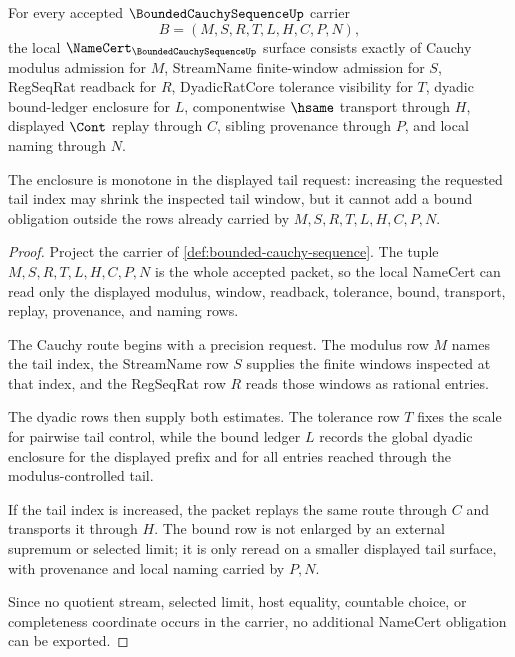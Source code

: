 \begin{theorem}
\label{thm:cauchy-tail-monotone-enclosure}
For every accepted $\BoundedCauchySequenceUp$ carrier
$$
B=(M,S,R,T,L,H,C,P,N),
$$
the local $\NameCert_{\BoundedCauchySequenceUp}$ surface consists exactly of Cauchy modulus admission for $M$, StreamName finite-window admission for $S$, RegSeqRat readback for $R$, DyadicRatCore tolerance visibility for $T$, dyadic bound-ledger enclosure for $L$, componentwise $\hsame$ transport through $H$, displayed $\Cont$ replay through $C$, sibling provenance through $P$, and local naming through $N$.

The enclosure is monotone in the displayed tail request: increasing the requested tail index may shrink the inspected tail window, but it cannot add a bound obligation outside the rows already carried by $M,S,R,T,L,H,C,P,N$.
\end{theorem}
\begin{proof}
Project the carrier of \autoref{def:bounded-cauchy-sequence}. The tuple $M,S,R,T,L,H,C,P,N$ is the whole accepted packet, so the local NameCert can read only the displayed modulus, window, readback, tolerance, bound, transport, replay, provenance, and naming rows.

The Cauchy route begins with a precision request. The modulus row $M$ names the tail index, the StreamName row $S$ supplies the finite windows inspected at that index, and the RegSeqRat row $R$ reads those windows as rational entries.

The dyadic rows then supply both estimates. The tolerance row $T$ fixes the scale for pairwise tail control, while the bound ledger $L$ records the global dyadic enclosure for the displayed prefix and for all entries reached through the modulus-controlled tail.

If the tail index is increased, the packet replays the same route through $C$ and transports it through $H$. The bound row is not enlarged by an external supremum or selected limit; it is only reread on a smaller displayed tail surface, with provenance and local naming carried by $P,N$.

Since no quotient stream, selected limit, host equality, countable choice, or completeness coordinate occurs in the carrier, no additional NameCert obligation can be exported.
\end{proof}

